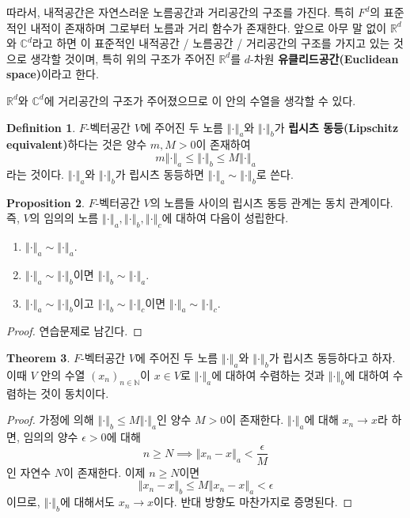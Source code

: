 \documentclass[11pt]{book}
\numberwithin{equation}{chapter}
\def\NN{\mathbb{N}}
\def\RR{\mathbb{R}}
\def\CC{\mathbb{C}}
\def\eps{\epsilon}
\newcommand{\norm}[1]{\left\Vert#1\right\Vert}
\theoremstyle{definition}
\newtheorem{thm}{Theorem}[section]
\newtheorem{prop}[thm]{Proposition}
\newtheorem{defn}[thm]{Definition}
\newenvironment{enum}
	{\begin{enumerate}[label=(\alph*), leftmargin=2\parindent]}
	{\end{enumerate}}
\begin{document}
따라서, 내적공간은 자연스러운 노름공간과 거리공간의 구조를 가진다. 특히 \(F^d\)의 표준적인 내적이 존재하며 그로부터 노름과 거리 함수가 존재한다. 앞으로 아무 말 없이 \(\RR^d\)와 \(\CC^d\)라고 하면 이 표준적인 내적공간 / 노름공간 / 거리공간의 구조를 가지고 있는 것으로 생각할 것이며, 특히 위의 구조가 주어진 \(\RR^d\)를 \(d\)-차원 \textbf{유클리드공간(Euclidean space)}이라고 한다.

\(\RR^d\)와 \(\CC^d\)에 거리공간의 구조가 주어졌으므로 이 안의 수열을 생각할 수 있다.

\begin{defn}
    \(F\)-벡터공간 \(V\)에 주어진 두 노름 \(\norm{\cdot}_a\)와 \(\norm{\cdot}_b\)가 \textbf{립시츠 동등(Lipschitz equivalent)}하다는 것은 양수 \(m, M > 0\)이 존재하여
    \[
    m \norm{\cdot}_a \le \norm{\cdot}_b \le M \norm{\cdot}_a
    \]
    라는 것이다. \(\norm{\cdot}_a\)와 \(\norm{\cdot}_b\)가 립시츠 동등하면 \(\norm{\cdot}_a \sim \norm{\cdot}_b\)로 쓴다.
\end{defn}

\begin{prop}
    \(F\)-벡터공간 \(V\)의 노름들 사이의 립시츠 동등 관계는 동치 관계이다. 즉, \(V\)의 임의의 노름 \(\norm{\cdot}_a, \norm{\cdot}_b, \norm{\cdot}_c\)에 대하여 다음이 성립한다.
    \begin{enum}
        \item \(\norm{\cdot}_a \sim \norm{\cdot}_a\).
        \item \(\norm{\cdot}_a \sim \norm{\cdot}_b\)이면 \(\norm{\cdot}_b \sim \norm{\cdot}_a\).
        \item \(\norm{\cdot}_a \sim \norm{\cdot}_b\)이고 \(\norm{\cdot}_b \sim \norm{\cdot}_c\)이면 \(\norm{\cdot}_a \sim \norm{\cdot}_c\).
    \end{enum}
\end{prop}
\begin{proof}
    연습문제로 남긴다.
\end{proof}

\begin{thm} \label{3.3.8}
    \(F\)-벡터공간 \(V\)에 주어진 두 노름 \(\norm{\cdot}_a\)와 \(\norm{\cdot}_b\)가 립시츠 동등하다고 하자. 이때 \(V\) 안의 수열 \((x_n)_{n \in \NN}\)이 \(x \in V\)로 \(\norm{\cdot}_a\)에 대하여 수렴하는 것과 \(\norm{\cdot}_b\)에 대하여 수렴하는 것이 동치이다.
\end{thm}
\begin{proof}
    가정에 의해 \(\norm{\cdot}_b \le M \norm{\cdot}_a\)인 양수 \(M > 0\)이 존재한다. \(\norm{\cdot}_a\)에 대해 \(x_n \to x\)라 하면, 임의의 양수 \(\eps > 0\)에 대해
    \[
        n \ge N \implies \norm{x_n - x}_{a} < \frac{\eps}{M}
    \]
    인 자연수 \(N\)이 존재한다. 이제 \(n \ge N\)이면
    \[
        \norm{x_n - x}_b \le M \norm{x_n - x}_a < \eps
    \]
    이므로, \(\norm{\cdot}_b\)에 대해서도 \(x_n \to x\)이다. 반대 방향도 마찬가지로 증명된다.
\end{proof}
\end{document}
